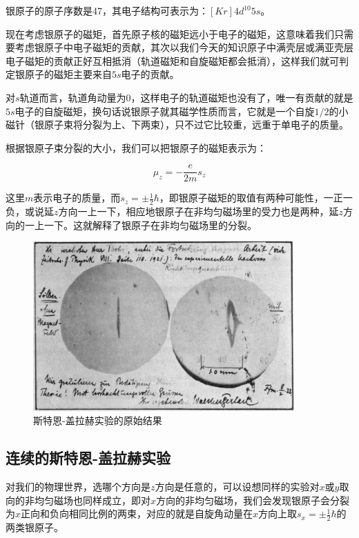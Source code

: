银原子的原子序数是47，其电子结构可表示为：$[Kr] 4 d^{10} 5s$。

现在考虑银原子的磁矩，首先原子核的磁矩远小于电子的磁矩，这意味着我们只需要考虑银原子中电子磁矩的贡献，其次以我们今天的知识原子中满壳层或满亚壳层电子磁矩的贡献正好互相抵消（轨道磁矩和自旋磁矩都会抵消），这样我们就可判定银原子的磁矩主要来自$5s$电子的贡献。

对$s$轨道而言，轨道角动量为0，这样电子的轨道磁矩也没有了，唯一有贡献的就是$5s$电子的自旋磁矩，换句话说银原子就其磁学性质而言，它就是一个自旋$1/2$的小磁针（银原子束将分裂为上、下两束），只不过它比较重，远重于单电子的质量。

根据银原子束分裂的大小，我们可以把银原子的磁矩表示为：

\begin{equation}
\mu_z = - \frac{e}{2m } s_z
\end{equation}

这里$m$表示电子的质量，而$s_z = \pm \frac{1}{2} \hbar$，即银原子磁矩的取值有两种可能性，一正一负，或说延$z$方向一上一下，相应地银原子在非均匀磁场里的受力也是两种，延$z$方向的一上一下。这就解释了银原子在非均匀磁场里的分裂。

\begin{figure}[htbp]
\begin{center}
\includegraphics[width=10cm]{SGExperiment/sg-result.jpg}
\caption{斯特恩-盖拉赫实验的原始结果}
\end{center}
\end{figure}

\subsection{连续的斯特恩-盖拉赫实验}

对我们的物理世界，选哪个方向是$z$方向是任意的，可以设想同样的实验对$x$或$y$取向的非均匀磁场也同样成立，即对$x$方向的非均匀磁场，我们会发现银原子会分裂为$x$正向和负向相同比例的两束，对应的就是自旋角动量在$x$方向上取$s_x = \pm \frac{1}{2} \hbar$的两类银原子。

